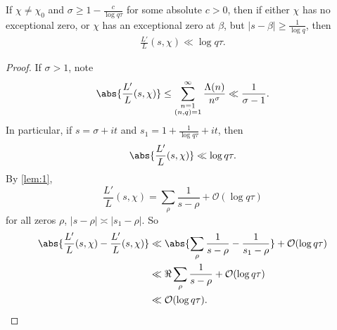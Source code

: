 \documentclass{article}
\newcommand{\1}{\mathbbm{1}}
\newcommand{\bigO}{\mathcal{O}}
\begin{document}
\begin{lemma}
  If $\chi \neq \chi_0$ and $\sigma \geq 1 - \frac{c}{\log q \tau}$ for some absolute $c > 0$, then if either $\chi$ has no exceptional zero, or $\chi$ has an exceptional zero at $\beta$, but $|s - \beta| \geq \frac{1}{\log q}$,
  then
  \begin{align*}
    \frac{L'}{L}(s,\chi) \ll \log q \tau.
  \end{align*}
\end{lemma}
\begin{proof}
  If $\sigma > 1$, note
  \begin{align*}
    \abs{\frac{L'}{L}(s,\chi)} \leq \sum_{\substack{n=1 \\ (n,q) = 1}}^\infty \frac{\Lambda(n)}{n^\sigma} \ll \frac{1}{\sigma-1}.
  \end{align*}
  In particular, if $s = \sigma + it$ and $s_1 = 1 + \frac{1}{\log q \tau} + it$, then
  \begin{align*}
    \abs{\frac{L'}{L}(s,\chi)} \ll \log q \tau.
  \end{align*}
  By \cref{lem:1},
  \begin{equation*}
    \frac{L'}{L} (s,\chi) = \sum_\rho \frac{1}{s-\rho} + \bigO(\log q \tau)
  \end{equation*}
  for all zeros $\rho$, $|s-\rho| \asymp |s_1 - \rho|$. So
  \begin{align*}
    \abs{\frac{L'}{L}(s,\chi) - \frac{L'}{L}(s,\chi)} &\ll \abs{\sum_\rho \frac{1}{s-\rho} - \frac{1}{s_1 - \rho}} + \bigO(\log q \tau) \\
                                                      &\ll \Re \sum_\rho \frac{1}{s - \rho} + \bigO(\log q \tau) \\
                                                      &\ll \bigO(\log q \tau). \qedhere
  \end{align*}
\end{proof}
\end{document}
